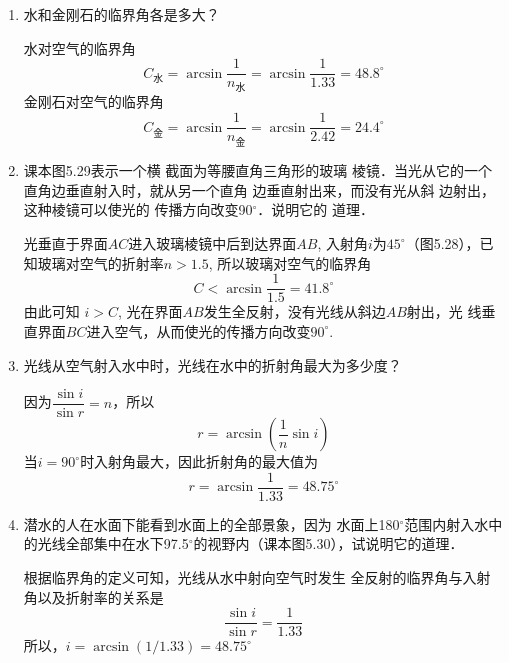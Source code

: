 \begin{enumerate}
    \item 水和金刚石的临界角各是多大？

    \begin{solution}
水对空气的临界角
\[C_{\text{水}}=\arcsin\frac{1}{n_{\text{水}}}=\arcsin\frac{1}{1.33}=48.8^{\circ}\]
金刚石对空气的临界角
\[C_{\text{金}}=\arcsin\frac{1}{n_{\text{金}}}=\arcsin\frac{1}{2.42}=24.4^{\circ}\]
    \end{solution}
    \item 课本图5.29表示一个横
截面为等腰直角三角形的玻璃
棱镜．当光从它的一个直角边垂直射入时，就从另一个直角
边垂直射出来，而没有光从斜
边射出，这种棱镜可以使光的
传播方向改变90$^\circ$．说明它的
道理．
\begin{figure}[htp]
	\centering
{}
	\caption{}
\end{figure}


\begin{solution}
    光垂直于界面$AC$进入玻璃棱镜中后到达界面$AB$, 入射角$i$为$45^{\circ}$（图5.28），已知玻璃对空气的折射率$n>1.5$,
    所以玻璃对空气的临界角
    \[C<\arcsin\frac{1}{1.5}=41.8^{\circ}\]
    由此可知
    $i>C$, 光在界面$AB$发生全反射，没有光线从斜边$AB$射出，光
    线垂直界面$BC$进入空气，从而使光的传播方向改变$90^{\circ}$.
\end{solution}
\item 光线从空气射入水中时，光线在水中的折射角最大为多少度？

\begin{solution}
因为$\dfrac{\sin i}{\sin r}=n$，所以
\[r=\arcsin\left(\frac{1}{n}\sin i\right)\]
当$i=90^{\circ}$时入射角最大，因此折射角的最大值为
\[r=\arcsin\frac{1}{1.33}=48.75^{\circ}\]
\end{solution}
\item 潜水的人在水面下能看到水面上的全部景象，因为
水面上180$^\circ$范围内射入水中的光线全部集中在水下97.5$^\circ$的视野内（课本图5.30），试说明它的道理．

    \begin{solution}
根据临界角的定义可知，光线从水中射向空气时发生
全反射的临界角与入射角以及折射率的关系是
\[\frac{\sin i}{\sin r}=\frac{1}{1.33}\]
所以，$i=\arcsin\left(1/1.33\right)=48.75^{\circ}$


\end{solution}
\end{enumerate}
